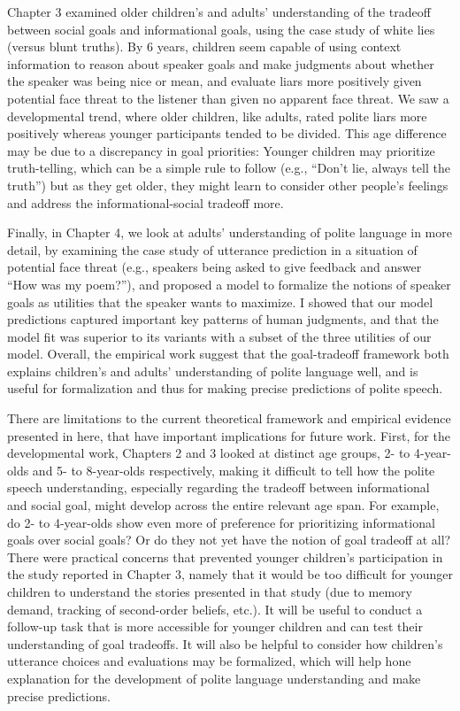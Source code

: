 \documentclass[oneside]{report}
\begin{document}
Chapter 3 examined older children's and adults' understanding of the
tradeoff between social goals and informational goals, using the case
study of white lies (versus blunt truths). By 6 years, children seem
capable of using context information to reason about speaker goals and
make judgments about whether the speaker was being nice or mean, and
evaluate liars more positively given potential face threat to the
listener than given no apparent face threat. We saw a developmental
trend, where older children, like adults, rated polite liars more
positively whereas younger participants tended to be divided. This age
difference may be due to a discrepancy in goal priorities: Younger
children may prioritize truth-telling, which can be a simple rule to
follow (e.g., ``Don't lie, always tell the truth'') but as they get
older, they might learn to consider other people's feelings and address
the informational-social tradeoff more.

Finally, in Chapter 4, we look at adults' understanding of polite
language in more detail, by examining the case study of utterance
prediction in a situation of potential face threat (e.g., speakers being
asked to give feedback and answer ``How was my poem?''), and proposed a
model to formalize the notions of speaker goals as utilities that the
speaker wants to maximize. I showed that our model predictions captured
important key patterns of human judgments, and that the model fit was
superior to its variants with a subset of the three utilities of our
model. Overall, the empirical work suggest that the goal-tradeoff
framework both explains children's and adults' understanding of polite
language well, and is useful for formalization and thus for making
precise predictions of polite speech.

There are limitations to the current theoretical framework and empirical
evidence presented in here, that have important implications for future
work. First, for the developmental work, Chapters 2 and 3 looked at
distinct age groups, 2- to 4-year-olds and 5- to 8-year-olds
respectively, making it difficult to tell how the polite speech
understanding, especially regarding the tradeoff between informational
and social goal, might develop across the entire relevant age span. For
example, do 2- to 4-year-olds show even more of preference for
prioritizing informational goals over social goals? Or do they not yet
have the notion of goal tradeoff at all? There were practical concerns
that prevented younger children's participation in the study reported in
Chapter 3, namely that it would be too difficult for younger children to
understand the stories presented in that study (due to memory demand,
tracking of second-order beliefs, etc.). It will be useful to conduct a
follow-up task that is more accessible for younger children and can test
their understanding of goal tradeoffs. It will also be helpful to
consider how children's utterance choices and evaluations may be
formalized, which will help hone explanation for the development of
polite language understanding and make precise predictions.
\end{document}
